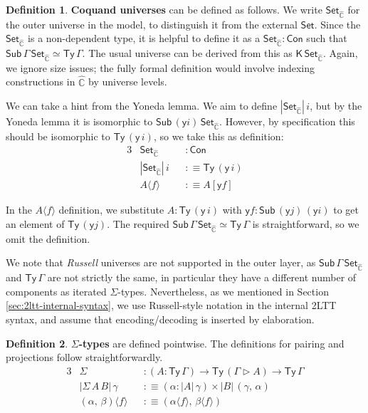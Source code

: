\documentclass[12pt,a4paper,twoside,openany]{book}
\theoremstyle{remark}
\theoremstyle{definition}
\newtheorem{mydefinition}{Definition}
\theoremstyle{theorem}
\newcommand{\ms}[1]{\mathsf{#1}}
\newcommand{\mbb}[1]{\mathbb{#1}}
\newcommand{\Con}{\mathsf{Con}}
\newcommand{\Sub}{\mathsf{Sub}}
\newcommand{\Ty}{\mathsf{Ty}}
\newcommand{\Set}{\mathsf{Set}}
\newcommand{\ext}{\triangleright}
\newcommand{\K}{\mathsf{K}}
\newcommand{\hmbbC}{\hat{\mbb{C}}}
\newcommand{\lab}{\langle}
\newcommand{\rab}{\rangle}
\newcommand{\defn}{:\equiv}
\newcommand{\yon}{\ms{y}}
\begin{document}
\begin{mydefinition}
\label{def:presheaf-univ}
\textbf{Coquand universes} can be defined as follows. We write $\Set_{\hmbbC}$
for the outer universe in the model, to distinguish it from the external
$\Set$. Since the $\Set_{\hmbbC}$ is a non-dependent type, it is helpful to
define it as a $\Set_{\hmbbC} : \Con$ such that $\Sub\,\Gamma\,\Set_{\hmbbC}
\simeq \Ty\,\Gamma$.  The usual universe can be derived from this as
$\K\,\Set_{\hmbbC}$. Again, we ignore size issues; the fully formal definition
would involve indexing constructions in $\hmbbC$ by universe levels.

We can take a hint from the Yoneda lemma. We aim to define $|\Set_{\hmbbC}|\,i$,
but by the Yoneda lemma it is isomorphic to $\Sub\,(\yon
i)\,\Set_{\hmbbC}$. However, by specification this should be isomorphic to
$\Ty\,(\yon\,i)$, so we take this as definition:
\begin{alignat*}{3}
  & \Set_{\hmbbC} &&: \Con\\
  &|\Set_{\hmbbC}|\,i &&\defn \Ty\,(\yon\,i)\\
  &A \lab f \rab &&\defn A[\yon f]
\end{alignat*}
\end{mydefinition}
In the $A \lab f \rab$ definition, we substitute $A : \Ty\,(\yon\,i)$ with $\yon
f : \Sub\,(\yon j)\,(\yon i)$ to get an element of $\Ty\,(\yon j)$.  The
required $\Sub\,\Gamma\,\Set_{\hmbbC} \simeq \Ty\,\Gamma$ is straightforward, so
we omit the definition.

We note that \emph{Russell} universes are not supported in the outer layer, as
$\Sub\,\Gamma\,\Set_{\hmbbC}$ and $\Ty\,\Gamma$ are not strictly the same, in
particular they have a different number of components as iterated
$\Sigma$-types. Nevertheless, as we mentioned in Section \ref{sec:2ltt-internal-syntax}, we
use Russell-style notation in the internal 2LTT syntax, and assume that encoding/decoding
is inserted by elaboration.

\begin{mydefinition}
\textbf{$\Sigma$-types} are defined pointwise. The definitions for pairing and
projections follow straightforwardly.
\begin{alignat*}{3}
  & \Sigma  &&: (A : \Ty\,\Gamma) \to \Ty\,(\Gamma\ext A) \to \Ty\,\Gamma\\    & |\Sigma\,A\,B|\,\gamma && \defn (\alpha : |A|\,\gamma) \times |B|\,(\gamma,\,\alpha)\\
  & (\alpha,\,\beta) \lab f \rab && \defn (\alpha \lab f \rab,\, \beta \lab f \rab)
\end{alignat*}
\end{mydefinition}
\end{document}
